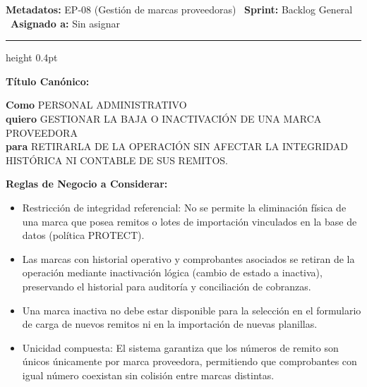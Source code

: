 \documentclass[a4paper,9pt]{article}
\begin{document}
\begin{tcolorbox}[hucard, title={\textbf{HU-255: BAJA Y CONTROL DE INTEGRIDAD DE MARCA PROVEEDORA} \hfill \scriptsize \colorbox{bluestatus}{\textbf{\ New\ }} \quad \colorbox{white}{\textcolor{primarydark}{\textbf{\ 0 pts\ }}}}]
\vspace{-1pt}
\noindent\textbf{\footnotesize Metadatos:} EP-08 (Gestión de marcas proveedoras) \textbar\ \textbf{Sprint:} Backlog General \textbar\ \textbf{Asignado a:} Sin asignar\par\vspace{2pt}
\hrule height 0.4pt\par\vspace{3pt}
\noindent\textbf{\footnotesize Título Canónico:}\par\vspace{1pt}
{\small \textbf{Como} PERSONAL ADMINISTRATIVO \\ \textbf{quiero} GESTIONAR LA BAJA O INACTIVACIÓN DE UNA MARCA PROVEEDORA \\ \textbf{para} RETIRARLA DE LA OPERACIÓN SIN AFECTAR LA INTEGRIDAD HISTÓRICA NI CONTABLE DE SUS REMITOS.}\par\vspace{3pt}
\noindent\textbf{\footnotesize Reglas de Negocio a Considerar:}\par\vspace{1pt}
{\footnotesize
\begin{itemize}[leftmargin=12pt, nosep, itemsep=1.5pt, topsep=1pt]
\item Restricción de integridad referencial: No se permite la eliminación física de una marca que posea remitos o lotes de importación vinculados en la base de datos (política PROTECT).
\item Las marcas con historial operativo y comprobantes asociados se retiran de la operación mediante inactivación lógica (cambio de estado a inactiva), preservando el historial para auditoría y conciliación de cobranzas.
\item Una marca inactiva no debe estar disponible para la selección en el formulario de carga de nuevos remitos ni en la importación de nuevas planillas.
\item Unicidad compuesta: El sistema garantiza que los números de remito son únicos únicamente por marca proveedora, permitiendo que comprobantes con igual número coexistan sin colisión entre marcas distintas.
\end{itemize}
}\par\vspace{3pt}

\end{tcolorbox}
\end{document}
